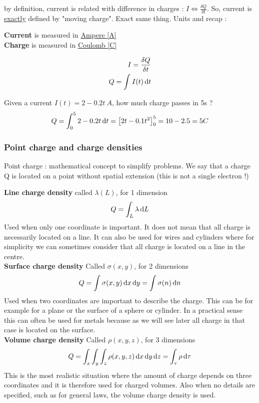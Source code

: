 \documentclass[12pt,a4paper]{article}
\begin{document}
by definition, current is related with difference in charges : $I \iff \frac{\delta Q}{\delta t}$. So, current is \uline{exactly} defined by "moving charge". Exact same thing. Units and recap :
\begin{boite}
	\begin{center}
		\textbf{Current} is measured in \uline{Ampere [A]}\\
		\textbf{Charge} is measured in \uline{Coulomb [C]}
	\end{center}
	\begin{align*}
	I = \frac{\delta Q}{\delta t}\\
	Q = \int_{}^{} I(t) \, \mathrm d t
	\end{align*}
\end{boite}
\begin{example}
	Given a current $I(t) = 2-0.2t\ A$, how much charge passes in 5s ?
	\[Q = \int_0^5 2-0.2t \, \mathrm d t= \big[2t-0.1t^2\big]_0^5 = 10-2.5 = 5 C\]
\end{example}

\subsubsection{Point charge and charge densities}
\begin{boite}
	 Point charge : mathematical concept to simplify problems. We say that a charge Q is located on a point without spatial extension (this is not a single electron !)
\end{boite}
\textbf{Line charge density}
called $\lambda(L)$, for 1 dimension
\[Q = \int_L \lambda \, \mathrm d L\]
Used when only one coordinate is important. It does not mean that all charge is necessarily located on a line. It can also be used for wires and cylinders where for simplicity we can sometimes consider that all charge is located on a line in the centre.\\
\textbf{Surface charge density}
Called $\sigma(x,y)$, for 2 dimensions 
\[Q = \int\sigma(x,y)\, \mathrm d x\, \mathrm d y = \int \sigma(n)\, \mathrm d n\]
Used when two coordinates are important to describe the charge. This can be for example for a plane or the surface of a sphere or cylinder. In a practical sense this can often be used for metals because as we will see later all charge in that case is located on the surface.\\
\textbf{Volume charge density}
Called $\rho(x,y,z)$, for 3 dimensions
\[Q = \int_x \int_y \int_z \rho(x,y,z) \, \mathrm d x\, \mathrm d y\, \mathrm d z = \int_{\tau} \rho \, \mathrm d \tau\]
This is the most realistic situation where the amount of charge depends on three coordinates and it is therefore used for charged volumes. Also when no details are specified, such as for general laws, the volume charge density is used.
\end{document}
